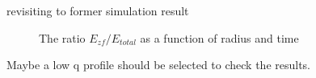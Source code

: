\documentclass{beamer}
\begin{document}
\begin{frame}{revisiting to former simulation result}
	\begin{figure}[H]
		\centering
		\caption{ The ratio $E_{zf}/E_{total}$ as a function of radius and time }
	\end{figure}

	Maybe a low q profile should be selected to check the results.
\end{frame}
\end{document}
